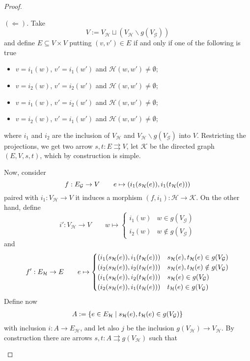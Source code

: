 \documentclass[runningheads,envcountsect]{lmcs}
\theoremstyle{plain}
\theoremstyle{definition}
\begin{document}
\begin{proof}
\begin{enumerate}
		\medskip 
		\noindent
		$(\Leftarrow)$. Take 
		\[V:=V_\mathcal{{H}}\sqcup (V_\mathcal{{H}}\smallsetminus g(V_\mathcal{{G}}))\]
		and define $E\subseteq V\times V$ putting $(v,v')\in E$ if and only if one of the following is true
		\begin{itemize}
	\item $v=i_1(w)$, $v'=i_1(w')$ and $\mathcal{{H}}(w,w')\neq \emptyset$; 
	\item $v=i_2(w)$, $v'=i_2(w')$ and $\mathcal{{H}}(w,w')\neq \emptyset$; 
	\item 	$v=i_1(w)$, $v'=i_2(w')$ and $\mathcal{{H}}(w,w')\neq \emptyset$; 
	\item $v=i_2(w)$, $v'=i_1(w')$ and $\mathcal{{H}}(w,w')\neq \emptyset$;
	\end{itemize}
	where $i_1$ and $i_2$ are the inclusion of $V_\mathcal{{H}}$ and $V_\mathcal{{H}}\smallsetminus g(V_\mathcal{{G}})$ into $V$. Restricting the projections, we get two arrow $s,t:E\rightrightarrows V$, let $\mathcal{{K}}$ be the directed graph $(E, V, s, t)$, which by construction is simple. 
	
	Now, consider
	\[f:E_\mathcal{{G}}\to V\qquad e \mapsto \qty(i_1\qty(s_\mathcal{{H}}\qty(e)),i_1\qty(t_\mathcal{{H}}\qty(e)) )\]
	paired with $i_1:V_\mathcal{{H}}\to V$ it induces a morphism $(f, i_1):\mathcal{{H}}\to \mathcal{{K}}$. On the other hand, define
	\begin{equation*}
	i':V_\mathcal{{H}}\to V \qquad w \mapsto \begin{cases}
	i_1(w) & w\in g(V_\mathcal{{G}})\\
	i_2(w) & w\notin g(V_\mathcal{{G}})
	\end{cases}
	\end{equation*}
	and 
	\begin{equation*}f':E_\mathcal{{H}}\to E \qquad e \mapsto \begin{cases}
	\qty(i_1\qty(s_\mathcal{{H}}(e)), i_1\qty(t_\mathcal{{H}}(e))) & s_\mathcal{{H}}(e), t_\mathcal{{H}}(e)\in g(V_\mathcal{{G}})\\
	\qty(i_2\qty(s_\mathcal{{H}}(e)), i_2\qty(t_\mathcal{{H}}(e))) & s_\mathcal{{H}}(e), t_\mathcal{{H}}(e)\notin g(V_\mathcal{{G}})\\
	\qty(i_1\qty(s_\mathcal{{H}}(e)), i_2\qty(t_\mathcal{{H}}(e))) & s_\mathcal{{H}}(e)\in g(V_\mathcal{{G}})\\
\qty(i_2\qty(s_\mathcal{{H}}(e)), i_1\qty(t_\mathcal{{H}}(e))) & t_\mathcal{{H}}(e)\in g(V_\mathcal{{G}})
	\end{cases}
	\end{equation*}
	Define now 
		\begin{gather*}
	A:=\qty{e\in E_\mathcal{{H}} \mid s_\mathcal{{H}}(e),t_\mathcal{{H}}(e)\in g(V_\mathcal{{G}})}
	\end{gather*}
	with inclusion $i:A\to E_\mathcal{{H}}$, and let also $j$ be the inclusion $g(V_\mathcal{{H}})\to V_\mathcal{{H}}$. 
	By construction there are arrows $s,t:A\rightrightarrows g(V_\mathcal{{H}})$ such that
	

\end{enumerate}
\end{proof}
\end{document}
